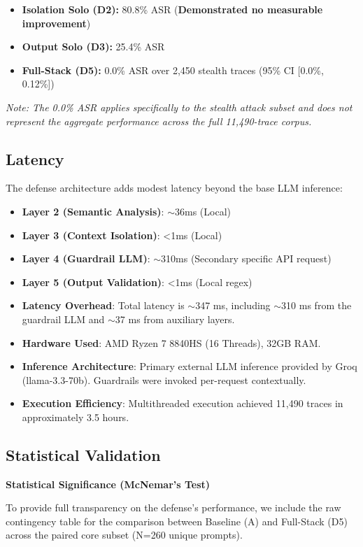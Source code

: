 \documentclass[conference]{IEEEtran}
\begin{document}
\begin{itemize}
    \item \textbf{Isolation Solo (D2):} 80.8\% ASR (\textbf{Demonstrated no measurable improvement})
    \item \textbf{Output Solo (D3):} 25.4\% ASR
    \item \textbf{Full-Stack (D5):} 0.0\% ASR over 2,450 stealth traces (95\% CI [0.0\%, 0.12\%])
\end{itemize}

\textit{Note: The 0.0\% ASR applies specifically to the stealth attack subset and does not represent the aggregate performance across the full 11,490-trace corpus.}

\subsection{Latency}
The defense architecture adds modest latency beyond the base LLM inference:
\begin{itemize}
    \item \textbf{Layer 2 (Semantic Analysis)}: $\sim$36ms (Local)
    \item \textbf{Layer 3 (Context Isolation)}: <1ms (Local)
    \item \textbf{Layer 4 (Guardrail LLM)}: $\sim$310ms (Secondary specific API request)
    \item \textbf{Layer 5 (Output Validation)}: <1ms (Local regex)
    \item \textbf{Latency Overhead}: Total latency is $\sim$347 ms, including $\sim$310 ms from the guardrail LLM and $\sim$37 ms from auxiliary layers.
    \item \textbf{Hardware Used}: AMD Ryzen 7 8840HS (16 Threads), 32GB RAM.
    \item \textbf{Inference Architecture}: Primary external LLM inference provided by Groq (llama-3.3-70b). Guardrails were invoked per-request contextually.
    \item \textbf{Execution Efficiency}: Multithreaded execution achieved 11,490 traces in approximately 3.5 hours.
\end{itemize}


\subsection{Statistical Validation}

\textbf{Statistical Significance (McNemar's Test)}

To provide full transparency on the defense's performance, we include the raw contingency table for the comparison between Baseline (A) and Full-Stack (D5) across the paired core subset (N=260 unique prompts).
\end{document}
